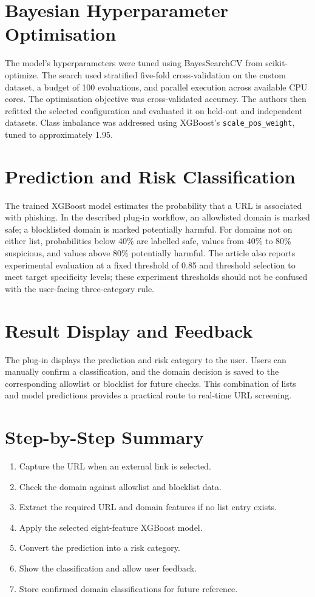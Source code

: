 \section{Bayesian Hyperparameter Optimisation}
The model's hyperparameters were tuned using BayesSearchCV from scikit-optimize. The search used stratified five-fold cross-validation on the custom dataset, a budget of 100 evaluations, and parallel execution across available CPU cores. The optimisation objective was cross-validated accuracy. The authors then refitted the selected configuration and evaluated it on held-out and independent datasets. Class imbalance was addressed using XGBoost's \texttt{scale\_pos\_weight}, tuned to approximately 1.95.\cite{bib1}

\section{Prediction and Risk Classification}
The trained XGBoost model estimates the probability that a URL is associated with phishing. In the described plug-in workflow, an allowlisted domain is marked safe; a blocklisted domain is marked potentially harmful. For domains not on either list, probabilities below 40\% are labelled safe, values from 40\% to 80\% suspicious, and values above 80\% potentially harmful. The article also reports experimental evaluation at a fixed threshold of 0.85 and threshold selection to meet target specificity levels; these experiment thresholds should not be confused with the user-facing three-category rule.\cite{bib1}

\section{Result Display and Feedback}
The plug-in displays the prediction and risk category to the user. Users can manually confirm a classification, and the domain decision is saved to the corresponding allowlist or blocklist for future checks. This combination of lists and model predictions provides a practical route to real-time URL screening.

\section{Step-by-Step Summary}
\begin{enumerate}
\item Capture the URL when an external link is selected.
\item Check the domain against allowlist and blocklist data.
\item Extract the required URL and domain features if no list entry exists.
\item Apply the selected eight-feature XGBoost model.
\item Convert the prediction into a risk category.
\item Show the classification and allow user feedback.
\item Store confirmed domain classifications for future reference.
\end{enumerate}
